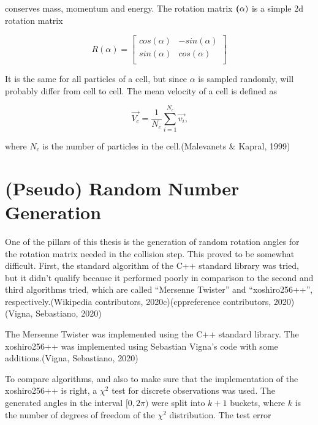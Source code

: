 \documentclass[
]{article}
\begin{document}
conserves mass, momentum and energy. The rotation matrix
\(\textbf(\alpha)\) is a simple 2d rotation matrix

\begin{equation}
R(\alpha) = 
\left[ \begin{array}{rr}
cos(\alpha) & -sin(\alpha) \\
sin(\alpha) & cos(\alpha) \\
\end{array}\right]
\end{equation}

It is the same for all particles of a cell, but since \(\alpha\) is
sampled randomly, will probably differ from cell to cell. The mean
velocity of a cell is defined as

\begin{equation}
\vec{V_c} = \frac{1}{N_c} \sum_{i=1}^{N_c} \vec{v_i} \textrm{,}
\end{equation}

where \(N_c\) is the number of particles in the cell.(Malevanets \&
Kapral, 1999)

\hypertarget{pseudo-random-number-generation}{%
\section{(Pseudo) Random Number
Generation}\label{pseudo-random-number-generation}}

One of the pillars of this thesis is the generation of random rotation
angles for the rotation matrix needed in the collision step. This proved
to be somewhat difficult. First, the standard algorithm of the C++
standard library was tried, but it didn't qualify because it performed
poorly in comparison to the second and third algorithms tried, which are
called ``Mersenne Twister'' and ``xoshiro256++'',
respectively.(Wikipedia contributors, 2020c)(cppreference contributors,
2020)(Vigna, Sebastiano, 2020)

The Mersenne Twister was implemented using the C++ standard library. The
xoshiro256++ was implemented using Sebastian Vigna's code with some
additions.(Vigna, Sebastiano, 2020)

To compare algorithms, and also to make sure that the implementation of
the xoshiro256++ is right, a \(\chi^2\) test for discrete observations
was used. The generated angles in the interval \([0, 2\pi)\) were split
into \(k+1\) buckets, where \(k\) is the number of degrees of freedom of
the \(\chi^2\) distribution. The test error
\end{document}
